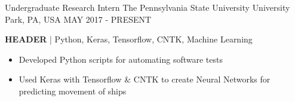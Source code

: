 

\begin{cventries}
	
	\cventry
	{Undergraduate Research Intern} %
	{The Pennsylvania State University} %
	{University Park, PA, USA} %
	{MAY 2017 - PRESENT} %
	{
		\begin{cvitems} %
			\item {\textbf{HEADER} | {\color{awesome}Python, Keras, Tensorflow, CNTK, Machine Learning}
				\begin{itemize}[noitemsep,wide=0pt, leftmargin=\dimexpr{} + 2\relax]
					\item[\textbullet]{Developed Python scripts for automating software tests}
					\item[\textbullet]{Used Keras with Tensorflow \& CNTK to create Neural Networks for predicting movement of ships}
				\end{itemize}}
		\end{cvitems}
	}
	

\end{cventries}
